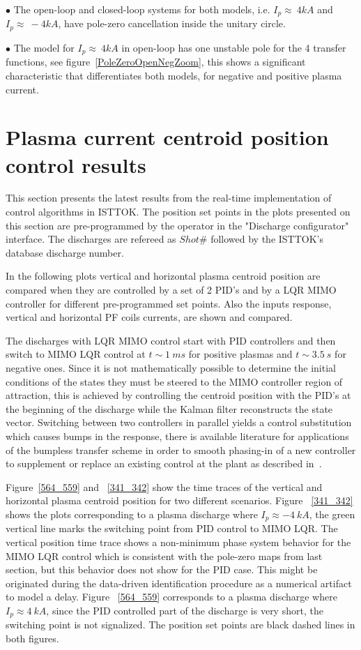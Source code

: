 $\bullet$  The open-loop and closed-loop systems for both models, i.e. $I_p\approx~4kA$ and $I_p\approx~-4kA$, have pole-zero cancellation inside the unitary circle.
\smallskip

$\bullet$  The model for $I_p\approx~4kA$ in open-loop has one unstable pole for the 4 transfer functions, see figure~\ref{PoleZeroOpenNegZoom}, this  shows a significant characteristic that differentiates both models, for negative and positive plasma current.\smallskip

\section{Plasma current centroid position control results}

This section presents the latest results from the real-time implementation of control algorithms in ISTTOK. The position set points  in the plots presented on this section are pre-programmed by the operator in the "Discharge configurator" interface. The discharges are refereed as $Shot \#$ followed by the ISTTOK's database discharge number.\smallskip

In the following plots vertical and horizontal plasma centroid position are compared when they are controlled by a set of 2 PID's and by a LQR MIMO controller for different pre-programmed set points. Also the inputs response, vertical and horizontal PF coils currents, are shown and compared.\smallskip

The discharges with  LQR MIMO control start with PID controllers and then switch to  MIMO LQR control at $t\sim 1~ms$ for positive plasmas and  $t\sim 3.5~s$ for negative ones. Since it is not mathematically possible to determine the initial conditions of the states they must be steered to the MIMO controller region of attraction, this is achieved by controlling the centroid position with the PID's  at the beginning of the discharge while the Kalman filter reconstructs the state vector. Switching between two controllers in parallel yields a control substitution which causes bumps in the response, there is available literature  for applications of the bumpless transfer scheme in order to smooth phasing-in of a new controller to supplement or replace an existing control at the plant as described in~\cite{Bendtsen2005}. \smallskip


Figure~\ref{564_559} and  ~\ref{341_342} show the time traces of the vertical and horizontal plasma centroid position for two different scenarios. Figure ~\ref{341_342} shows the plots corresponding to a plasma discharge where $I_p\approx -4~kA$, the green vertical line marks the switching point from PID control to MIMO LQR. The vertical position time trace shows a non-minimum phase system behavior for the MIMO LQR control which is consistent with the pole-zero maps from last section,  but this behavior does not show for the PID case. This might be originated during the data-driven identification procedure as a numerical artifact to model a delay. Figure ~\ref{564_559} corresponds to a plasma discharge where $I_p\approx 4~kA$, since the  PID controlled part of the discharge is very short, the switching point is not signalized. The position set points are black dashed lines in both figures.\smallskip


